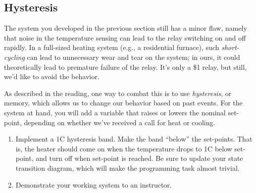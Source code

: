 \documentclass[11pt]{article} %
\begin{document}
\subsection*{Hysteresis}

The system you developed in the previous section still has a minor flaw, namely that noise in the temperature sensing can lead to the relay switching on and off rapidly. In a full-sized heating system (e.g., a residential furnace), such \emph{short-cycling} can lead to unnecessary wear and tear on the system; in ours, it could theoretically lead to premature failure of the relay. It's only a \$1 relay, but still, we'd like to avoid the behavior.

As described in the reading, one way to combat this is to use \emph{hysteresis}, or memory, which allows us to change our behavior based on past events. For the system at hand, you will add a variable that raises or lowers the nominal set-point, depending on whether we've received a call for heat or cooling. 

\begin{enumerate}
\item Implement a 1C hysteresis band. Make the band ``below'' the set-points. That is, the heater should come on when the temperature drops to 1C below set-point, and turn off when set-point is reached. Be sure to update your state transition diagram, which will make the programming task almost trivial.
\item Demonstrate your working system to an instructor.
\end{enumerate}
\end{document}
